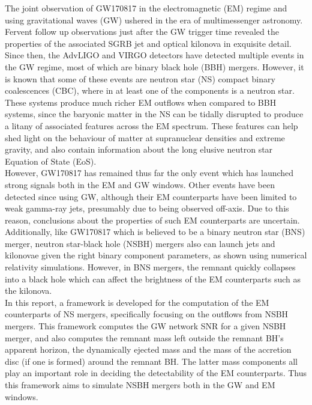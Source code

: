 The joint observation of GW170817 in the electromagnetic (EM) regime and using
gravitational waves (GW) ushered in the era of multimessenger astronomy. Fervent follow
up observations just after the GW trigger time revealed the properties of the associated
SGRB jet and optical kilonova in exquisite detail. Since then, the AdvLIGO and VIRGO
detectors have detected multiple events in the GW regime, most of which are binary black
hole (BBH) mergers. However, it is known that some of these events are neutron star (NS)
compact binary coalescences (CBC), where in at least one of the components is a neutron
star.\\
These systems produce much richer EM outflows when compared to BBH systems, since the
baryonic matter in the NS can be tidally disrupted to produce a litany of associated
features across the EM spectrum. These features can help shed light on the behaviour of
matter at supranuclear densities and extreme gravity, and also contain information about
the long elusive neutron star Equation of State (EoS).\\
However, GW170817 has remained thus far the only event which has launched strong signals
both in the EM and GW windows. Other events have been detected since using GW, although
their EM counterparts have been limited to weak gamma-ray jets, presumably due to being
observed off-axis. Due to this reason, conclusions about the properties of such EM
counterparts are uncertain. Additionally, like GW170817 which is believed to be a binary
neutron star (BNS) merger, neutron star-black hole (NSBH) mergers also can launch jets
and kilonovae given the right binary component parameters, as shown using numerical
relativity simulations. However, in BNS mergers, the remnant quickly collapses into a
black hole which can affect the brightness of the EM counterparts such as the
kilonova.\\
In this report, a framework is developed for the computation of the EM counterparts of
NS mergers, specifically focusing on the outflows from NSBH mergers. This framework
computes the GW network SNR for a given NSBH merger, and also computes the remnant mass
left outside the remnant BH's apparent horizon, the dynamically ejected mass and the
mass of the accretion disc (if one is formed) around the remnant BH. The latter mass
components all play an important role in deciding the detectability of the EM
counterparts. Thus this framework aims to simulate NSBH mergers both in the GW and EM
windows.

